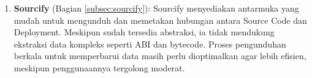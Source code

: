 \begin{enumerate}
	\item \textbf{Sourcify} \parencite{sourcify_website} (Bagian \ref{subsec:sourcify}): Sourcify menyediakan antarmuka yang mudah untuk mengunduh dan memetakan hubungan antara Source Code dan Deployment. Meskipun sudah tersedia abstraksi, ia tidak mendukung ekstraksi data kompleks seperti ABI dan bytecode. Proses pengunduhan berkala untuk memperbarui data masih perlu dioptimalkan agar lebih efisien, meskipun penggunaannya tergolong moderat.
\end{enumerate}

